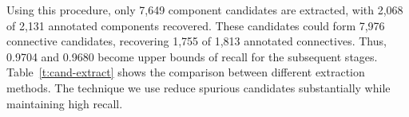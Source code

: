 Using this procedure, only 7,649 component candidates are extracted, with 2,068 of 2,131 annotated
components recovered. These candidates could form 7,976 connective candidates, recovering
1,755 of 1,813 annotated connectives. Thus, 0.9704 and 0.9680 become upper bounds of recall
for the subsequent stages. Table~\ref{t:cand-extract} shows the comparison between different
extraction methods. The technique we use reduce spurious candidates substantially while
maintaining high recall.


